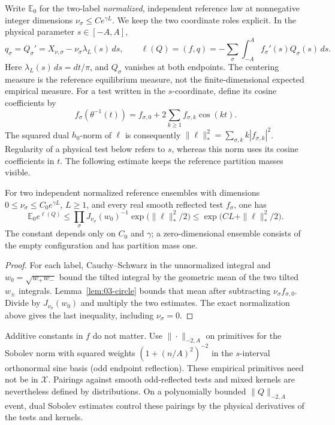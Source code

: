 Write \(\mathbb E_0\) for the two-label \emph{normalized}, independent reference law at nonnegative integer dimensions \(\nu_\sigma\le C e^{\gamma L}\). We keep the two coordinate roles explicit. In the physical parameter \(s\in[-A,A]\),
\[
 q_\sigma=Q_\sigma'=X_{\nu,\sigma}-\nu_\sigma\lambda_L(s)\,ds,
 \qquad
 \ell(Q)=(f,q)=-\sum_\sigma\int_{-A}^A f_\sigma'(s)Q_\sigma(s)\,ds.
\]
Here \(\lambda_L(s)\,ds=dt/\pi\), and \(Q_\sigma\) vanishes at both endpoints. The centering measure is the reference equilibrium measure, not the finite-dimensional expected empirical measure. For a test written in the \(s\)-coordinate, define its cosine coefficients by
\[
 f_\sigma(\theta^{-1}(t))
   =f_{\sigma,0}+2\sum_{k\ge1}f_{\sigma,k}\cos(kt).
\]
The squared dual \(h_0\)-norm of \(\ell\) is consequently
\(\|\ell\|_*^2=\sum_{\sigma,k}k|f_{\sigma,k}|^2\).
Regularity of a physical test below refers to \(s\), whereas this norm uses its cosine coefficients in \(t\). The following estimate keeps the reference partition masses visible.
\begin{theorem}\label{E:reference-source}
For two independent normalized reference ensembles with dimensions
$0\le\nu_\sigma\le C_0e^{\gamma L}$, $L\ge1$, and every real smooth
reflected test $f_\sigma$, one has
\begin{equation}\label{eq:G-13}
 \mathbb E_0 e^{\ell(Q)}
 \le \prod_\sigma J_{\nu_\sigma}(w_0)^{-1}
       \exp\bigl(\|\ell\|_*^2/2\bigr)
 \le\exp\bigl(C L+\|\ell\|_*^2/2\bigr).
\end{equation}
The constant depends only on $C_0$ and $\gamma$; a zero-dimensional
ensemble consists of the empty configuration and has partition mass one.
\end{theorem}
\begin{proof}
For each label, Cauchy--Schwarz in the unnormalized integral and
$w_0=\sqrt{w_+w_-}$ bound the tilted integral by the geometric mean
of the two tilted $w_\pm$ integrals. Lemma~\ref{lem:03-circle} bounds
that mean after subtracting $\nu_\sigma f_{\sigma,0}$.
Divide by $J_{\nu_\sigma}(w_0)$ and multiply the two estimates.
The exact normalization above gives the last inequality, including
$\nu_\sigma=0$.
\end{proof}
Additive constants in \(f\) do not matter. Use \(\|\cdot\|_{-2,A}\) on primitives for the Sobolev norm with squared weights \((1+(n/A)^2)^{-2}\) in the \(s\)-interval orthonormal sine basis (odd endpoint reflection). These empirical primitives need not be in \(\mathcal X\). Pairings against smooth odd-reflected tests and mixed kernels are nevertheless defined by distributions. On a polynomially bounded \(\|Q\|_{-2,A}\) event, dual Sobolev estimates control these pairings by the physical derivatives of the tests and kernels.

